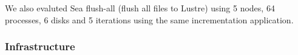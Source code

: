       We also evaluted Sea flush-all (flush all files to Lustre) using 5 nodes,
      64 processes, 6 disks and 5 iterations using the same incrementation application.



\subsubsection{Infrastructure}


